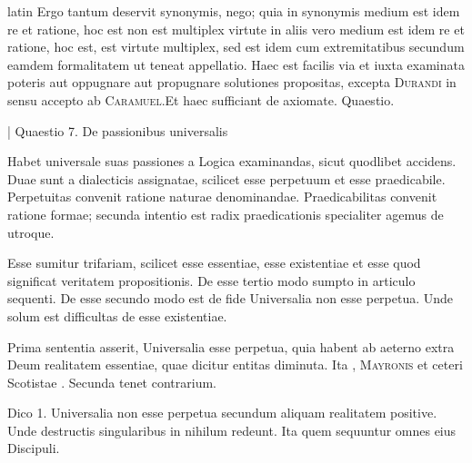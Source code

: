 \begin{otherlanguage*}{latin}
\pstart
Ergo tantum deservit synonymis, nego; quia in synonymis medium est idem re et ratione, hoc est non est multiplex virtute in aliis vero medium est idem re et ratione, hoc est, est virtute multiplex, sed est idem cum extremitatibus secundum eamdem formalitatem ut teneat appellatio. Haec est facilis via et iuxta examinata poteris aut oppugnare aut propugnare solutiones propositas, excepta \textsc{Durandi} in sensu accepto ab \textsc{Caramuel}.Et haec sufficiant de axiomate. Quaestio. 
\pend

\pstart
{}
\pend

\pstart
\noindent%
\textnormal{|} Quaestio 7. De passionibus universalis 
\pend

\pstart
Habet universale suas passiones a Logica examinandas, sicut quodlibet accidens. Duae sunt a dialecticis assignatae, scilicet esse perpetuum et esse praedicabile. Perpetuitas convenit ratione naturae denominandae. Praedicabilitas convenit ratione formae; secunda intentio est radix praedicationis specialiter agemus de utroque. 
\pend

\pstart
{}
\pend

\pstart
Esse sumitur trifariam, scilicet esse essentiae, esse existentiae et esse quod significat veritatem propositionis. De esse tertio modo sumpto in articulo sequenti. De esse secundo modo est de fide Universalia non esse perpetua. Unde solum est difficultas de esse existentiae. 
\pend

\pstart
Prima sententia asserit, Universalia esse perpetua, quia habent ab aeterno extra Deum realitatem essentiae, quae dicitur entitas diminuta. Ita , \textsc{Mayronis}\index[persons]{} et ceteri Scotistae . Secunda tenet contrarium. 
\pend

\pstart
Dico 1. Universalia non esse perpetua secundum aliquam realitatem positive. Unde destructis singularibus in nihilum redeunt. Ita  quem sequuntur omnes eius Discipuli. 
\pend


\end{otherlanguage*}
